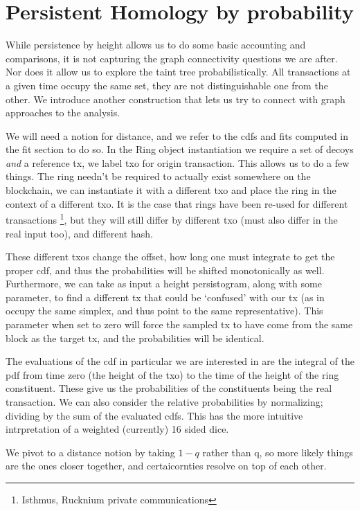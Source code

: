\section{Persistent Homology by probability}

While persistence by height allows us to do some basic accounting and comparisons, it is not capturing the graph connectivity questions we are after.  
Nor does it allow us to explore the taint tree probabilistically.
All transactions at a given time occupy the same set, they are not distinguishable one from the other.
We introduce another construction that lets us try to connect with graph approaches to the analysis.

We will need a notion for distance, and we refer to the cdfs and fits computed in the fit section to do so.
In the Ring object instantiation we require a set of decoys \textit{and} a reference tx, we label txo for origin transaction.  
This allows us to do a few things.  
The ring needn't be required to actually exist somewhere on the blockchain, we can instantiate it with a different txo and place the ring in the context of a different txo.
It is the case that rings have been re-used for different transactions \footnote{Isthmus, Rucknium private communications}, but they will still differ by different txo (must also differ in the real input too), and different hash.

These different txos change the offset, how long one must integrate to get the proper cdf, and thus the probabilities will be shifted monotonically as well.  
Furthermore, we can take as input a height persistogram, along with some parameter, to find a different tx that could be `confused' with our tx (as in occupy the same simplex, and thus point to the same representative).
This parameter when set to zero will force the sampled tx to have come from the same block as the target tx, and the probabilities will be identical.

The evaluations of the cdf in particular we are interested in are the integral of the pdf from time zero (the height of the txo) to the time of the height of the ring constituent.  
These give us the probabilities of the constituents being the real transaction.
We can also consider the relative probabilities by normalizing; dividing by the sum of the evaluated cdfs.
This has the more intuitive intrpretation of a weighted (currently) 16 sided dice.  

We pivot to a distance notion by taking $1-q$ rather than q, so more likely things are the ones closer together, and certaicornties resolve on top of each other.

